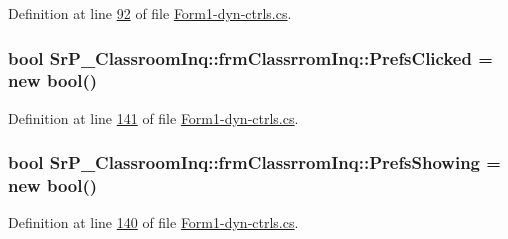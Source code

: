 \-Definition at line \hyperlink{_form1-dyn-ctrls_8cs_source_l00092}{92} of file \hyperlink{_form1-dyn-ctrls_8cs_source}{\-Form1-\/dyn-\/ctrls.\-cs}.

\hypertarget{class_sr_p___classroom_inq_1_1frm_classrrom_inq_a9e5a6ce376468f2e13dae9f60e86ccf6}{
\subsubsection[{\-Prefs\-Clicked}]{\setlength{\rightskip}{0pt plus 5cm}bool {\bf \-Sr\-P\-\_\-\-Classroom\-Inq\-::frm\-Classrrom\-Inq\-::\-Prefs\-Clicked} = new bool()}}
\label{class_sr_p___classroom_inq_1_1frm_classrrom_inq_a9e5a6ce376468f2e13dae9f60e86ccf6}


\-Definition at line \hyperlink{_form1-dyn-ctrls_8cs_source_l00141}{141} of file \hyperlink{_form1-dyn-ctrls_8cs_source}{\-Form1-\/dyn-\/ctrls.\-cs}.

\hypertarget{class_sr_p___classroom_inq_1_1frm_classrrom_inq_a915bf1ba42b54c697d1d90043610385f}{
\subsubsection[{\-Prefs\-Showing}]{\setlength{\rightskip}{0pt plus 5cm}bool {\bf \-Sr\-P\-\_\-\-Classroom\-Inq\-::frm\-Classrrom\-Inq\-::\-Prefs\-Showing} = new bool()}}
\label{class_sr_p___classroom_inq_1_1frm_classrrom_inq_a915bf1ba42b54c697d1d90043610385f}


\-Definition at line \hyperlink{_form1-dyn-ctrls_8cs_source_l00140}{140} of file \hyperlink{_form1-dyn-ctrls_8cs_source}{\-Form1-\/dyn-\/ctrls.\-cs}.

